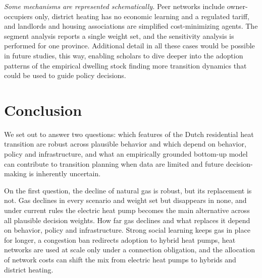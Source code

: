 \documentclass[preprint,12pt,authoryear]{elsarticle}
\begin{document}
\emph{Some mechanisms are represented schematically.} Peer networks include
owner-occupiers only, district heating has no economic learning and a
regulated tariff, and landlords and housing
associations are simplified cost-minimizing agents. The segment analysis 
reports a single weight set, and the sensitivity analysis is performed for 
one province. Additional detail in all these cases would be possible in future
studies, this way, enabling scholars to dive deeper into the adoption patterns
of the empirical dwelling stock finding more transition dynamics that could
be used to guide policy decisions.


\section{Conclusion}
\label{sec:conclusion}

We set out to answer two questions: which features of the Dutch residential
heat transition are robust across plausible behavior and which depend on
behavior, policy and infrastructure, and what an empirically grounded
bottom-up model can contribute to transition planning when data are limited
and future decision-making is inherently uncertain.

On the first question, the decline of natural gas is robust, but its
replacement is not. Gas declines in every scenario and weight set but
disappears in none, and under current rules the electric heat pump becomes
the main alternative across all plausible decision weights. How far gas
declines and what replaces it depend on behavior, policy and infrastructure.
Strong social learning keeps gas in place for longer, a congestion ban
redirects adoption to hybrid heat pumps, heat networks are used at scale only
under a connection obligation, and the allocation of network costs can shift
the mix from electric heat pumps to hybrids and district heating.
\end{document}

